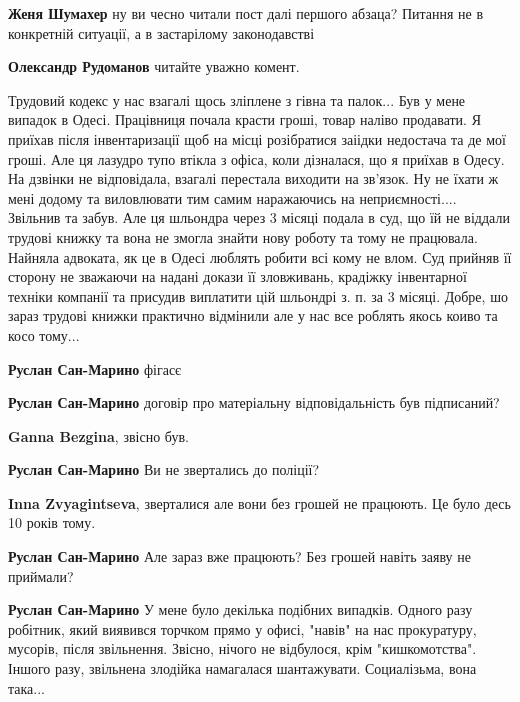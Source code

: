 \begin{itemize}
\begin{itemize} %
\textbf{Женя Шумахер} ну ви чесно читали пост далі першого абзаца? Питання не в конкретній ситуації, а в застарілому законодавстві

\textbf{Олександр Рудоманов} читайте уважно комент.
\end{itemize} %


Трудовий кодекс у нас взагалі щось зліплене з гівна та палок... Був у мене
випадок в Одесі. Працівниця почала красти гроші, товар наліво продавати. Я
приїхав після інвентаризації щоб на місці розібратися заіідки недостача та де
мої гроші. Але ця лазудро тупо втікла з офіса, коли дізналася, що я приїхав в
Одесу. На дзвінки не відповідала, взагалі перестала виходити на зв’язок. Ну не
їхати ж мені додому та виловлювати тим самим наражаючись на неприємності....
Звільнив та забув. Але ця шльондра через 3 місяці подала в суд, що їй не
віддали трудові книжку та вона не змогла знайти нову роботу та тому не
працювала. Найняла адвоката, як це в Одесі люблять робити всі кому не влом. Суд
прийняв її сторону не зважаючи на надані докази її зловживань, крадіжку
інвентарної техніки компанії та присудив виплатити цій шльондрі з. п. за 3
місяці.  Добре, шо зараз трудові книжки практично відмінили але у нас все
роблять якось коиво та косо тому...

\begin{itemize} %
\textbf{Руслан Сан-Марино} фігасє

\textbf{Руслан Сан-Марино} договір про матеріальну відповідальність був підписаний?

\textbf{Ganna Bezgina}, звісно був.

\textbf{Руслан Сан-Марино} Ви не звертались до поліції?

\textbf{Inna Zvyagintseva}, зверталися але вони без грошей не працюють. Це було десь 10 років тому.

\textbf{Руслан Сан-Марино} Але зараз вже працюють? Без грошей навіть заяву не приймали?

\textbf{Руслан Сан-Марино} У мене було декілька подібних випадків. Одного разу робітник, який виявився торчком прямо у офисі, "навів" на нас прокуратуру, мусорів, після звільнення. Звісно, нічого не відбулося, крім "кишкомотства". Іншого разу, звільнена злодійка намагалася шантажувати. Социалізьма, вона така...
\end{itemize} %


\end{itemize}

